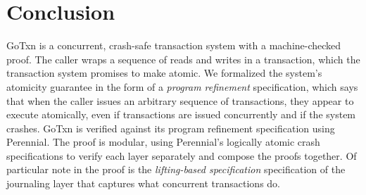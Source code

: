 \section{Conclusion}
\label{sec:gotxn:concl}

GoTxn is a concurrent, crash-safe transaction system with a machine-checked
proof. The caller wraps a sequence of reads and writes in a transaction, which
the transaction system promises to make atomic. We formalized the system's
atomicity guarantee in the form of a \emph{program refinement} specification,
which says that when the caller issues an arbitrary sequence of transactions,
they appear to execute atomically, even if transactions are issued concurrently
and if the system crashes. GoTxn is verified against its program refinement
specification using Perennial. The proof is modular, using Perennial's logically
atomic crash specifications to verify each layer separately and compose the
proofs together. Of particular note in the proof is the \emph{lifting-based
specification} specification of the journaling layer that captures what
concurrent transactions do.

